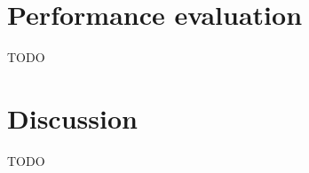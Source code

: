 \documentclass[a4paper,10pt,twoside]{IEEEtran}
\begin{document}
\section{Performance evaluation}
\label{sec:evaluation}

TODO

\section{Discussion}
\label{sec:discussion}

TODO



\newpage




\newpage
\appendix
\end{document}
